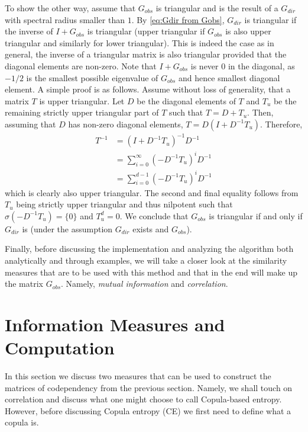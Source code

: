 \documentclass[../Thesis.tex]{subfiles}
\begin{document}
To show the other way, assume that $G_{obs}$ is triangular and is the result of a $G_{dir}$ with spectral radius smaller than $1$. By \autoref{eq:Gdir from Gobs}, $G_{dir}$ is triangular if the inverse of $I + G_{obs}$ is triangular (upper triangular if $G_{obs}$ is also upper triangular and similarly for lower triangular). This is indeed the case as in general, the inverse of a triangular matrix is also triangular provided that the diagonal elements are non-zero.
Note that  $ I + G_{obs}$ is never $0$ in the diagonal, as $-1/2$ is the smallest possible eigenvalue of $G_{obs}$ and hence smallest diagonal element. A simple proof is as follows. Assume without loss of generality, that a matrix $T$ is upper triangular. Let $D$ be the diagonal elements of $T$ and $T_u$ be the remaining strictly upper triangular part of $T$ such that $T = D + T_{u}$. Then, assuming that $D$ has non-zero diagonal elements, $T = D \left(I + D^{-1}T_u\right)$. Therefore,
\begin{align*}
    T^{-1} & = \left(I + D^{-1}T_u\right)^{-1} D^{-1}               \\
           & = \sum_{i=0}^\infty \left(- D^{-1} T_u\right)^i D^{-1}\\
           & = \sum_{i=0}^{d-1} \left(- D^{-1} T_u\right)^i D^{-1}
\end{align*}
which is clearly also upper triangular. The second and final equality follows from $T_u$ being strictly upper triangular and thus nilpotent such that $\sigma\left(-D^{-1} T_u\right) = \{0\}$ and $T_u^d = 0$. We conclude that $G_{obs}$ is triangular if and only if $G_{dir}$ is (under the assumption $G_{dir}$ exists and $G_{obs}$).

Finally, before discussing the implementation and analyzing the algorithm both analytically and through examples, we will take a closer look at the similarity measures that are to be used with this method and that in the end will make up the matrix $G_{obs}$. Namely, \textit{mutual information} and \textit{correlation}.


\section{Information Measures and Computation}\label{seq:Information measures and computation}
In this section we discuss two measures that can be used to construct the matrices of codependency from the previous section. Namely, we shall touch on correlation and discuss what one might choose to call Copula-based entropy. However, before discussing Copula entropy (CE) we first need to define what a copula is.
\end{document}
